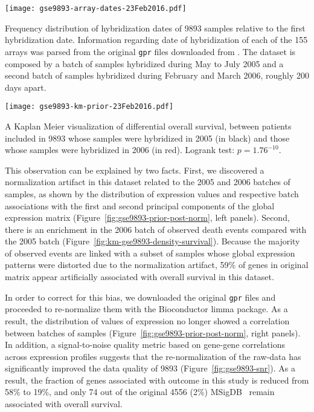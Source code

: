 \begin{marginfigure}%
  \begin{center}
    \texttt{[image: gse9893-array-dates-23Feb2016.pdf]}
    \caption[Time distribution of hybridization dates of the samples in
    9893]{Frequency distribution of hybridization dates of
      9893 samples relative to the first hybridization date.
      Information regarding date of hybridization of each of the 155 arrays was
      parsed from the original \texttt{gpr} files downloaded from
      .  The dataset is composed by a batch of samples hybridized
      during May to July 2005 and a second batch of samples hybridized during
      February and March 2006, roughly 200 days apart.}
    \label{fig:array-dates}
  \end{center}
\end{marginfigure}

\begin{marginfigure}%
  \begin{center}
    \texttt{[image: gse9893-km-prior-23Feb2016.pdf]}
    \caption[Kaplan Meyer of dataset 9893 discretized by time
    batches]{A Kaplan Meier visualization of differential overall survival,
      between patients included in 9893 whose samples were
      hybridized in 2005 (in black) and those whose samples were hybridized in
      2006 (in red). Logrank test: $p = 1.76^{-10}$.}
    \label{fig:km-gse9893-prior}
  \end{center}
\end{marginfigure}

This observation can be explained by two facts.  First, we discovered a
normalization artifact in this dataset related to the 2005 and 2006 batches
of samples, as shown by the distribution of expression values and respective
batch associations with the first and second principal components of the global
expression matrix (Figure~\ref{fig:gse9893-prior-post-norm}, left panels).
Second, there is an enrichment in the 2006 batch of observed death events
compared with the 2005 batch (Figure~\ref{fig:km-gse9893-density-survival}).
Because the majority of observed events are linked with a subset of samples
whose global expression patterns were distorted due to the normalization
artifact, 59\% of genes in original matrix appear artificially associated with
overall survival in this dataset.

In order to correct for this bias, we downloaded the original \texttt{gpr} files
and proceeded to re-normalize them with the \textsf{Bioconductor limma} package.
As a result, the distribution of values of expression no longer showed a
correlation between batches of samples
(Figure~\ref{fig:gse9893-prior-post-norm}, right panels).  In addition, a
signal-to-noise quality metric based on gene-gene correlations across expression
profiles\cite{venet_measure_2012} suggests that the re-normalization of the
raw-data has significantly improved the data quality of 9893
(Figure~\ref{fig:gse9893-snr}).  As a result, the fraction of genes associated
with outcome in this study is reduced from 58\% to 19\%, and only 74 out of the
original 4556 (2\%) \mbox{MSigDB } remain associated with overall
survival.

